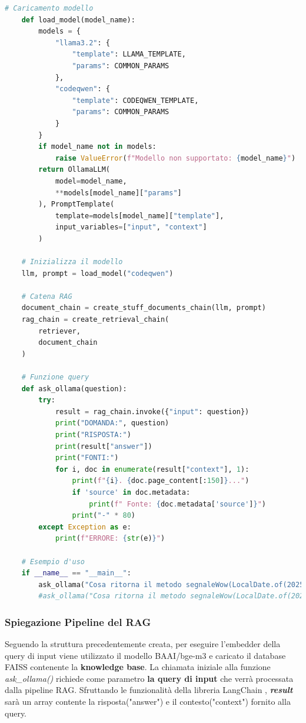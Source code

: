\documentclass[12pt,a4paper,openright,twoside]{book}
\begin{document}
\begin{lstlisting}[language=Python, caption={Pipeline RAG}, label={lst:rag}]
    # Caricamento modello
    def load_model(model_name):
        models = {
            "llama3.2": {
                "template": LLAMA_TEMPLATE,
                "params": COMMON_PARAMS
            },
            "codeqwen": {
                "template": CODEQWEN_TEMPLATE,
                "params": COMMON_PARAMS
            }
        }
        if model_name not in models:
            raise ValueError(f"Modello non supportato: {model_name}")
        return OllamaLLM(
            model=model_name,
            **models[model_name]["params"]
        ), PromptTemplate(
            template=models[model_name]["template"],
            input_variables=["input", "context"]
        )
    
    # Inizializza il modello
    llm, prompt = load_model("codeqwen")
    
    # Catena RAG
    document_chain = create_stuff_documents_chain(llm, prompt)
    rag_chain = create_retrieval_chain(
        retriever,
        document_chain
    )
    
    # Funzione query
    def ask_ollama(question):
        try:
            result = rag_chain.invoke({"input": question})
            print("DOMANDA:", question)
            print("RISPOSTA:")
            print(result["answer"])
            print("FONTI:")
            for i, doc in enumerate(result["context"], 1):
                print(f"{i}. {doc.page_content[:150]}...")
                if 'source' in doc.metadata:
                    print(f" Fonte: {doc.metadata['source']}")
                print("-" * 80)
        except Exception as e:
            print(f"ERRORE: {str(e)}")
    
    # Esempio d'uso
    if __name__ == "__main__":
        ask_ollama("Cosa ritorna il metodo segnaleWow(LocalDate.of(2025, 1, 10)) che utilizza la funzione getMessaggioMagico() della libreria DateUtilCustom?")
        #ask_ollama("Cosa ritorna il metodo segnaleWow(LocalDate.of(2025, 1, 10))?")
\end{lstlisting}
\subsubsection{Spiegazione Pipeline del RAG}
    Seguendo la struttura precedentemente creata, per eseguire l'embedder della query di input viene utilizzato il modello BAAI/bge-m3 e
    caricato il database FAISS contenente la \textbf{knowledge base}.
    La chiamata iniziale alla funzione \emph{ask\_ollama()} richiede come parametro \textbf{la query di input} che verrà processata dalla pipeline RAG.
    Sfruttando le funzionalità della libreria LangChain \cite{langchain-retrieval-chain}, \textbf{\emph{result}} sarà un array contente la risposta("answer") e il contesto("context") fornito alla query.
\end{document}

